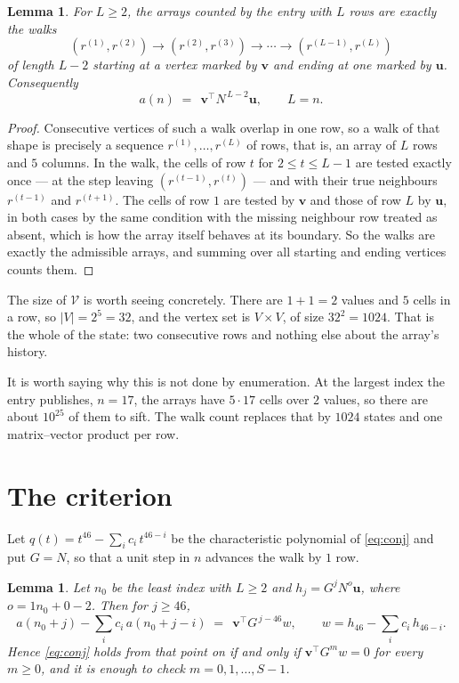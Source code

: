 \documentclass[11pt,a4paper]{article}
\theoremstyle{plain}
\newtheorem{lemma}[theorem]{Lemma}
\theoremstyle{definition}
\begin{document}
\begin{lemma}\label{lem:walk}
For $L\ge2$, the arrays counted by the entry with $L$ rows are exactly the walks
\[
(r^{(1)},r^{(2)})\to(r^{(2)},r^{(3)})\to\cdots\to(r^{(L-1)},r^{(L)})
\]
of length $L-2$ starting at a vertex marked by $\mathbf{v}$ and ending at one marked by
$\mathbf{u}$. Consequently
\[
a(n)\;=\;\,\mathbf{v}^{\!\top}N^{\,L-2}\mathbf{u},\qquad L=n .
\]
\end{lemma}

\begin{proof}
Consecutive vertices of such a walk overlap in one row, so a walk of that shape is
precisely a sequence $r^{(1)},\dots,r^{(L)}$ of rows, that is, an array of $L$ rows
and $5$ columns. In the walk, the cells of row $t$ for $2\le t\le L-1$ are tested
exactly once --- at the step leaving $(r^{(t-1)},r^{(t)})$ --- and with their true
neighbours $r^{(t-1)}$ and $r^{(t+1)}$. The cells of row $1$ are tested by
$\mathbf{v}$ and those of row $L$ by $\mathbf{u}$, in both cases by the same condition
with the missing neighbour row treated as absent, which is how the array itself behaves at
its boundary. So the walks are exactly the admissible arrays, and summing over all starting
and ending vertices counts them.
\end{proof}


The size of $\mathcal V$ is worth seeing concretely. There are $1+1=2$ values
and $5$ cells in a row, so $|V|=2^{5}=32$, and the vertex set is
$V\times V$, of size $32^2=1024$. That is the whole of the state: two consecutive
rows and nothing else about the array's history.

It is worth saying why this is not done by enumeration. At the largest index the entry
publishes, $n=17$, the arrays have $5\cdot17$ cells over
$2$ values, so there are about $10^{25}$ of them to sift. The
walk count replaces that by $1024$ states and one matrix--vector product per row.
\section{The criterion}

Let $q(t)=t^{46}-\sum_i c_i\,t^{46-i}$ be the characteristic polynomial of
\eqref{eq:conj} and put $G=N$, so that a unit step in $n$ advances the walk by
$1$ row.

\begin{lemma}\label{lem:crit}
Let $n_0$ be the least index with $L\ge2$ and $h_j=G^{j}N^{o}\mathbf{u}$, where
$o=1n_0+0-2$. Then for $j\ge46$,
\[
a(n_0+j)-\sum_i c_i\,a(n_0+j-i)\;=\;\,\mathbf{v}^{\!\top}G^{\,j-46}w,
\qquad w=h_{46}-\sum_i c_i\,h_{46-i} .
\]
Hence \eqref{eq:conj} holds from that point on if and only if
$\mathbf{v}^{\!\top}G^{m}w=0$ for every $m\ge0$, and it is enough to check
$m=0,1,\dots,S-1$.
\end{lemma}
\end{document}
